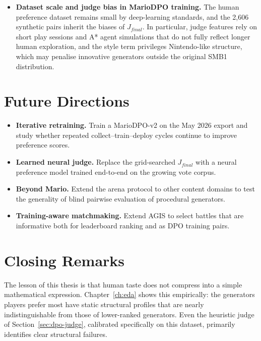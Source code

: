 \documentclass[shortabstract, mgr, english]{iithesis}
\begin{document}
\begin{itemize}
          Players familiar with the original Nintendo levels may have
          recognised them despite the blind setup, introducing a potential
          nostalgia or familiarity bias in favour of the human-authored
          baseline.
    \item \textbf{Dataset scale and judge bias in MarioDPO training.}
          The human preference dataset remains small by deep-learning standards,
          and the 2,606 synthetic pairs inherit the biases of $J_{final}$. In
          particular, judge features rely on short play sessions and A* agent
          simulations that do not fully reflect longer human exploration, and
          the style term privileges Nintendo-like structure, which may penalise
          innovative generators outside the original SMB1 distribution.
\end{itemize}

\section{Future Directions}
\label{sec:conc-future}

\begin{itemize}
    \item \textbf{Iterative retraining.} Train a MarioDPO-v2 on the May 2026
          export and study whether repeated collect--train--deploy cycles
          continue to improve preference scores.
    \item \textbf{Learned neural judge.} Replace the grid-searched
          $J_{final}$ with a neural preference model trained end-to-end on the
          growing vote corpus.
    \item \textbf{Beyond Mario.} Extend the arena protocol to other content
          domains to test the generality of blind pairwise evaluation of
          procedural generators.
    \item \textbf{Training-aware matchmaking.} Extend AGIS to select
          battles that are informative both for leaderboard ranking and as DPO training pairs.
\end{itemize}

\section[Closing Remarks]{Closing Remarks}
\label{sec:conc-closing}

The lesson of this thesis is that human taste does not
compress into a simple mathematical expression. Chapter~\ref{ch:eda} shows
this empirically: the generators players prefer most have static structural profiles that are nearly
indistinguishable from those of lower-ranked generators. Even the heuristic judge
of Section~\ref{sec:dpo-judge}, calibrated specifically on this dataset,
primarily identifies clear structural failures.
\end{document}
